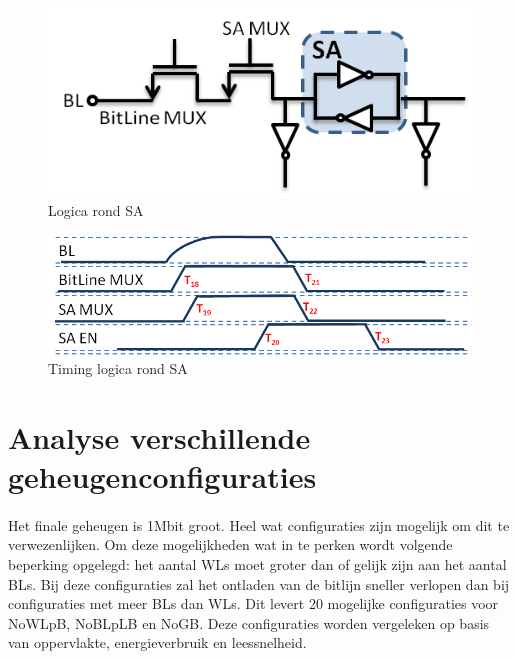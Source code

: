 \begin{figure}[!ht]
  \centering
  \includegraphics[scale=0.6]{../fig/hfdstk-timing-sa1.png}
  \caption[SA:logica]{Logica rond SA}
  \label{fig:sa_timing1}
\end{figure}

\begin{figure}[!ht]
  \centering
  \includegraphics[scale=0.9]{../fig/hfdstk-timing-sa2.png}
  \caption[SA:timing]{Timing logica rond SA}
  \label{fig:sa_timing2}
\end{figure}

\section{Analyse verschillende geheugenconfiguraties}
\paragraph{}
Het finale geheugen is 1Mbit groot. Heel wat configuraties zijn mogelijk om dit te verwezenlijken. Om deze mogelijkheden wat in te perken wordt volgende beperking opgelegd: het aantal WLs moet groter dan of gelijk zijn aan het aantal BLs. Bij deze configuraties zal het ontladen van de bitlijn sneller verlopen dan bij configuraties met meer BLs dan WLs. Dit levert 20 mogelijke configuraties voor NoWLpB, NoBLpLB en NoGB. Deze configuraties worden vergeleken op basis van oppervlakte, energieverbruik en leessnelheid. 

